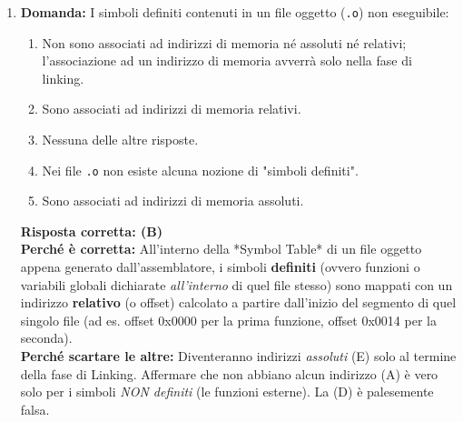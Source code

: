 \documentclass[12pt, a4paper]{article}
\begin{document}
\begin{enumerate}
\newpage
    
    \textbf{Risposta corretta: (C)} \\
    \textbf{Perché è corretta:} Nello schema del datapath, l'addizionatore ausiliario posto in alto serve unicamente a calcolare l'indirizzo bersaglio per le istruzioni di Branch (salti condizionati). Poiché le istruzioni in memoria sono allineate alla \textit{word} (4 byte), l'offset salvato dentro l'istruzione indica il numero di "parole" da saltare. Prima di sommarlo al PC (che conta in byte), questo offset deve essere moltiplicato per 4. In hardware, moltiplicare per 4 equivale a uno Shift Logico a Sinistra di 2 bit, trasformando l'offset da "word" a "byte". \\
    \textbf{Perché scartare le altre:} L'indirizzo base per i salti condizionati è già relativo (si somma al Program Counter), l'addizionatore e lo shift \textit{non} convertono in assoluto (A). Il calcolo degli indirizzi per la memoria dati (\texttt{lw}, \texttt{sw}) viene eseguito direttamente dalla ALU principale (B), non dall'addizionatore in alto.

    \item \textbf{Domanda:} I simboli definiti contenuti in un file oggetto (\texttt{.o}) non eseguibile:
    \begin{enumerate}[label=(\Alph*)]
        \item Non sono associati ad indirizzi di memoria né assoluti né relativi; l'associazione ad un indirizzo di memoria avverrà solo nella fase di linking.
        \item Sono associati ad indirizzi di memoria relativi.
        \item Nessuna delle altre risposte.
        \item Nei file \texttt{.o} non esiste alcuna nozione di "simboli definiti".
        \item Sono associati ad indirizzi di memoria assoluti.
    \end{enumerate}
    \textbf{Risposta corretta: (B)} \\
    \textbf{Perché è corretta:} All'interno della *Symbol Table* di un file oggetto appena generato dall'assemblatore, i simboli \textbf{definiti} (ovvero funzioni o variabili globali dichiarate \textit{all'interno} di quel file stesso) sono mappati con un indirizzo \textbf{relativo} (o offset) calcolato a partire dall'inizio del segmento di quel singolo file (ad es. offset 0x0000 per la prima funzione, offset 0x0014 per la seconda). \\
    \textbf{Perché scartare le altre:} Diventeranno indirizzi \textit{assoluti} (E) solo al termine della fase di Linking. Affermare che non abbiano alcun indirizzo (A) è vero solo per i simboli \textit{NON definiti} (le funzioni esterne). La (D) è palesemente falsa.


\end{enumerate}
\end{document}
